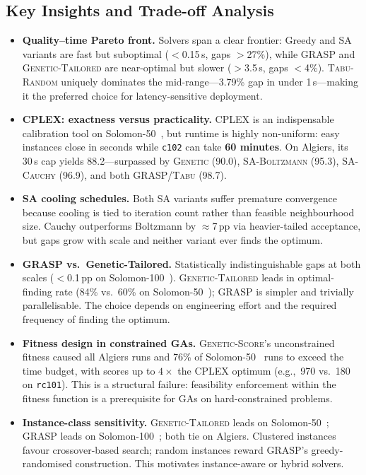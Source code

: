 \subsection{Key Insights and Trade-off Analysis}
\label{sec:insights}

\begin{itemize}[leftmargin=*, noitemsep, topsep=3pt]

  \item \textbf{Quality--time Pareto front.} Solvers span a clear frontier: Greedy and SA
  variants are fast but suboptimal ($<$0.15\,s, gaps $>$27\%), while \textsc{GRASP} and
  \textsc{Genetic-Tailored} are near-optimal but slower ($>$3.5\,s, gaps $<$4\%).
  \textsc{Tabu-Random} uniquely dominates the mid-range---3.79\% gap in under 1\,s---making
  it the preferred choice for latency-sensitive deployment.

  \item \textbf{CPLEX: exactness versus practicality.} CPLEX is an indispensable calibration
  tool on Solomon-50~\cite{solomon50}, but runtime is highly non-uniform: easy instances close
  in seconds while \texttt{c102} can take \textbf{60 minutes}. On Algiers, its 30\,s cap
  yields 88.2---surpassed by \textsc{Genetic} (90.0), \textsc{SA-Boltzmann} (95.3),
  \textsc{SA-Cauchy} (96.9), and both \textsc{GRASP}/\textsc{Tabu} (98.7).

  \item \textbf{SA cooling schedules.} Both SA variants suffer premature convergence because
  cooling is tied to iteration count rather than feasible neighbourhood size. Cauchy
  outperforms Boltzmann by $\approx$7\,pp via heavier-tailed acceptance, but gaps grow with
  scale and neither variant ever finds the optimum.

  \item \textbf{GRASP vs.\ Genetic-Tailored.} Statistically indistinguishable gaps at both
  scales ($<$0.1\,pp on Solomon-100~\cite{solomon100}). \textsc{Genetic-Tailored} leads in
  optimal-finding rate (84\% vs.\ 60\% on Solomon-50~\cite{solomon50}); \textsc{GRASP} is
  simpler and trivially parallelisable. The choice depends on engineering effort and the
  required frequency of finding the optimum.

  \item \textbf{Fitness design in constrained GAs.} \textsc{Genetic-Score}'s unconstrained
  fitness caused all Algiers runs and 76\% of Solomon-50~\cite{solomon50} runs to exceed the
  time budget, with scores up to $4\times$ the CPLEX optimum (e.g.,\ 970 vs.\ 180 on
  \texttt{rc101}). This is a structural failure: feasibility enforcement within the fitness
  function is a prerequisite for GAs on hard-constrained problems.

  \item \textbf{Instance-class sensitivity.} \textsc{Genetic-Tailored} leads on
  Solomon-50~\cite{solomon50}; \textsc{GRASP} leads on Solomon-100~\cite{solomon100}; both
  tie on Algiers. Clustered instances favour crossover-based search; random instances reward
  GRASP's greedy-randomised construction. This motivates instance-aware or hybrid solvers.

\end{itemize}

